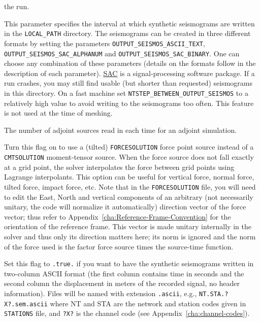 \begin{description}
the run.
%
\item [{\texttt{NTSTEP\_BETWEEN\_OUTPUT\_SEISMOS}}] This parameter specifies
the interval at which synthetic seismograms are written in the \texttt{LOCAL\_PATH}
directory. The seismograms can be created in three different formats
by setting the parameters \texttt{OUTPUT\_SEISMOS\_ASCII\_TEXT}, \texttt{OUTPUT\_SEISMOS\_SAC\_ALPHANUM}
and \texttt{OUTPUT\_SEISMOS\_SAC\_BINARY}.
One can choose any combination of these
parameters (details on the formats follow in the description of each
parameter). \href{http://www.iris.edu/software/sac/}{SAC} is a signal-processing software
package. If a run crashes, you may still find usable (but shorter
than requested) seismograms in this directory. On a fast machine set
\texttt{NTSTEP\_BETWEEN\_OUTPUT\_SEISMOS} to a relatively high value
to avoid writing to the seismograms too often. This feature is not
used at the time of meshing.
%
\item [{\texttt{NTSTEP\_BETWEEN\_READ\_ADJSRC}}] The number of adjoint
sources read in each time for an adjoint simulation.
%
\item [{\texttt{USE\_FORCE\_POINT\_SOURCE}}] Turn this flag on to use a
(tilted) \texttt{FORCESOLUTION} force point source instead of a \texttt{CMTSOLUTION}
moment-tensor source. When the force source does not fall exactly
at a grid point, the solver interpolates the force between grid points
using Lagrange interpolants. This option can be useful for vertical force, normal
force, tilted force, impact force, etc. Note that in the \texttt{FORCESOLUTION}
file, you will need to edit the East, North and vertical components
of an arbitrary (not necessarily unitary, the code will normalize it automatically) direction vector of the force vector;
thus refer to Appendix~\ref{cha:Reference-Frame-Convention} for the orientation
of the reference frame. This vector is made unitary internally in
the solver and thus only its direction matters here; its norm is ignored
and the norm of the force used is the factor force source times the
source-time function.
%
\item [{\texttt{OUTPUT\_SEISMOS\_ASCII\_TEXT}}] Set this flag to \texttt{.true.}
if you want to have the synthetic seismograms written in two-column
ASCII format (the first column contains time in seconds and the second
column the displacement in meters of the recorded signal, no header
information). Files will be named with extension \texttt{.ascii}, e.g., \texttt{NT.STA.?X?.sem.ascii}
where NT and STA are the network and station codes given in \texttt{STATIONS} file, and \texttt{?X?} is the channel code (see Appendix~\ref{cha:channel-codes}).

\end{description}
